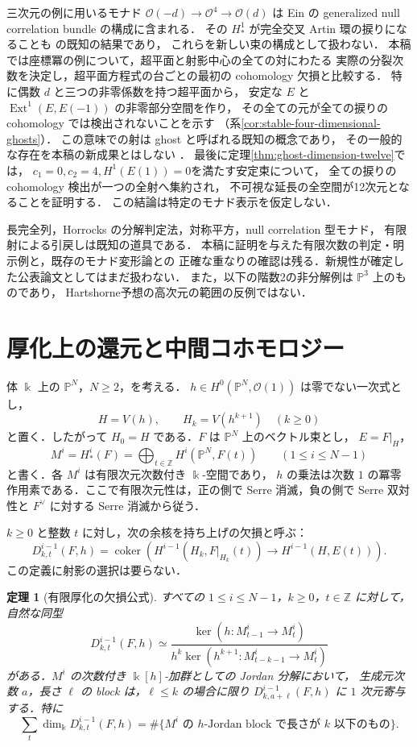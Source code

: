 \documentclass[a4paper,11pt]{ltjsarticle}
\numberwithin{equation}{section}
\theoremstyle{plain}
\newtheorem{theorem}{定理}[section]
\theoremstyle{definition}
\theoremstyle{remark}
\begin{document}
三次元の例に用いるモナド
$\mathcal O(-d)\to\mathcal O^4\to\mathcal O(d)$
は Ein の generalized null correlation bundle の構成に含まれる．
その $H^1_*$ が完全交叉 Artin 環の捩りになることも
\cite[式(1.1.c), Proposition 1.1]{Ein1988}の既知の結果であり，
これらを新しい束の構成として扱わない．
本稿では座標冪の例について，超平面と射影中心の全ての対にわたる
実際の分裂次数を決定し，超平面方程式の台ごとの最初の cohomology 欠損と比較する．
特に偶数 $d$ と三つの非零係数を持つ超平面から，
安定な $E$ と $\operatorname{Ext}^1(E,E(-1))$ の非零部分空間を作り，
その全ての元が全ての捩りの cohomology では検出されないことを示す
（系\ref{cor:stable-four-dimensional-ghosts}）．
この意味での射は ghost と呼ばれる既知の概念であり，
その一般的な存在を本稿の新成果とはしない
\cite[Definition 2.10, Example 2.24]{BallardFaveroKatzarkov2013}．
最後に定理\ref{thm:ghost-dimension-twelve}では，
$c_1=0,c_2=4,H^1(E(1))=0$を満たす安定束について，
全ての捩りの cohomology 検出が一つの全射へ集約され，
不可視な延長の全空間が12次元となることを証明する．
この結論は特定のモナド表示を仮定しない．

長完全列，Horrocks の分解判定法，対称平方，null correlation 型モナド，
有限射による引戻しは既知の道具である．
本稿に証明を与えた有限次数の判定・明示例と，既存のモナド変形論との
正確な重なりの確認は残る．新規性が確定した公表論文としてはまだ扱わない．
また，以下の階数2の非分解例は $\mathbb P^3$ 上のものであり，
Hartshorne予想の高次元の範囲の反例ではない．

\section{厚化上の還元と中間コホモロジー}

体 $\Bbbk$ 上の $\mathbb P^N$，$N\geq 2$，を考える．
$h\in H^0(\mathbb P^N,\mathcal O(1))$ は零でない一次式とし，
\[
 H=V(h),\qquad H_k=V(h^{k+1})\quad(k\geq 0)
\]
と置く．したがって $H_0=H$ である．$F$ は $\mathbb P^N$ 上のベクトル束とし，
$E=F|_H$，
\[
 M^i=H^i_*(F)=\bigoplus_{t\in\mathbb Z}H^i(\mathbb P^N,F(t))
 \qquad(1\leq i\leq N-1)
\]
と書く．各 $M^i$ は有限次元次数付き $\Bbbk$-空間であり，
$h$ の乗法は次数 $1$ の冪零作用素である．ここで有限次元性は，正の側で
Serre 消滅，負の側で Serre 双対性と $F^\vee$ に対する Serre 消滅から従う．

$k\geq 0$ と整数 $t$ に対し，次の余核を持ち上げの欠損と呼ぶ：
\[
 D^{i-1}_{k,t}(F,h)=\operatorname{coker}\left(
 H^{i-1}(H_k,F|_{H_k}(t))\longrightarrow H^{i-1}(H,E(t))\right).
\]
この定義に射影の選択は要らない．

\begin{theorem}[有限厚化の欠損公式]\label{thm:jet-defect}
すべての $1\leq i\leq N-1$，$k\geq 0$，$t\in\mathbb Z$ に対して，自然な同型
\[
 D^{i-1}_{k,t}(F,h)\simeq
 \frac{\ker\!\left(h:M^i_{t-1}\longrightarrow M^i_t\right)}
 {h^k\ker\!\left(h^{k+1}:M^i_{t-k-1}\longrightarrow M^i_t\right)}
 \tag{\ast}\label{eq:jet-defect}
\]
がある．$M^i$ の次数付き $\Bbbk[h]$-加群としての Jordan 分解において，
生成元次数 $a$，長さ $\ell$ の block は，$\ell\leq k$ の場合に限り
$D^{i-1}_{k,a+\ell}(F,h)$ に $1$ 次元寄与する．特に
\[
 \sum_t\dim_\Bbbk D^{i-1}_{k,t}(F,h)
 =\#\{M^i\text{ の }h\text{-Jordan block で長さが }k\text{ 以下のもの}\}.
\]
\end{theorem}
\end{document}

